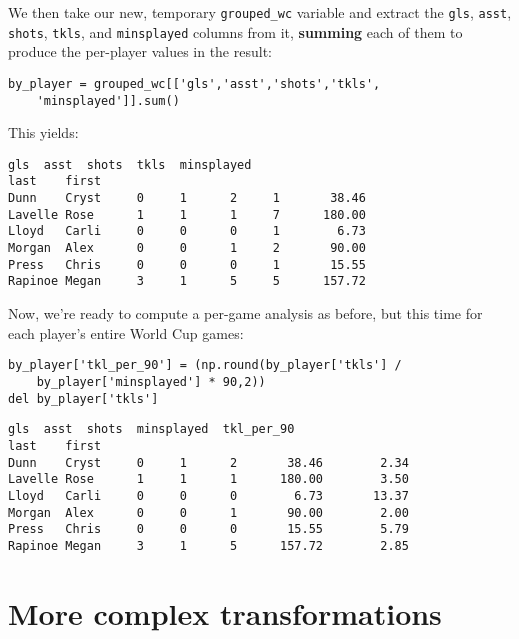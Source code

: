 We then take our new, temporary \texttt{grouped\_wc} variable and extract the
\texttt{gls}, \texttt{asst}, \texttt{shots}, \texttt{tkls}, and
\texttt{minsplayed} columns from it, \textbf{summing} each of them to produce
the per-player values in the result:


\begin{Verbatim}[fontsize=\footnotesize,samepage=true,frame=single,framesep=3mm]
by_player = grouped_wc[['gls','asst','shots','tkls',
    'minsplayed']].sum()
\end{Verbatim}

This yields:

\begin{Verbatim}[fontsize=\small,samepage=true,frame=leftline,framesep=5mm,framerule=1mm]
                gls  asst  shots  tkls  minsplayed
last    first                                             
Dunn    Cryst     0     1      2     1       38.46
Lavelle Rose      1     1      1     7      180.00
Lloyd   Carli     0     0      0     1        6.73
Morgan  Alex      0     0      1     2       90.00
Press   Chris     0     0      0     1       15.55
Rapinoe Megan     3     1      5     5      157.72
\end{Verbatim}

Now, we're ready to compute a per-game analysis as before, but this time for
each player's entire World Cup games:

\begin{Verbatim}[fontsize=\small,samepage=true,frame=single,framesep=3mm]
by_player['tkl_per_90'] = (np.round(by_player['tkls'] /
    by_player['minsplayed'] * 90,2))
del by_player['tkls']
\end{Verbatim}
\vspace{-.2in}

\begin{Verbatim}[fontsize=\small,samepage=true,frame=leftline,framesep=5mm,framerule=1mm]
                gls  asst  shots  minsplayed  tkl_per_90
last    first                                                
Dunn    Cryst     0     1      2       38.46        2.34
Lavelle Rose      1     1      1      180.00        3.50
Lloyd   Carli     0     0      0        6.73       13.37
Morgan  Alex      0     0      1       90.00        2.00
Press   Chris     0     0      0       15.55        5.79
Rapinoe Megan     3     1      5      157.72        2.85
\end{Verbatim}

\section{More complex transformations}

